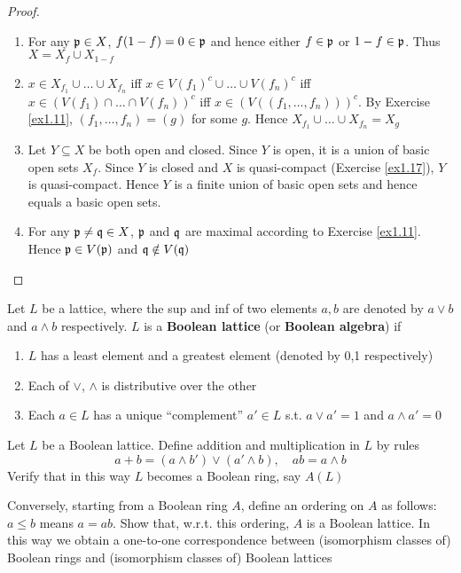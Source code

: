 \documentclass[11pt]{article}
\begin{document}
\begin{proof}
\begin{enumerate}
\item For any \(\mathfrak{p}\in X\), \(f(1-f)=0\in\mathfrak{p}\) and hence either \(f\in\mathfrak{p}\) or \(1-f\in\mathfrak{p}\). Thus \(X=X_f\cup X_{1-f}\)
\item \(x\in X_{f_1}\cup\dots\cup X_{f_n}\) iff \(x\in V(f_1)^c\cup\dots\cup V(f_n)^c\) iff \(x\in(V(f_1)\cap\dots\cap V(f_n))^c\) iff
\(x\in(V((f_1,\dots,f_n)))^c\). By Exercise \ref{ex1.11}, \((f_1,\dots,f_n)=(g)\) for some \(g\).
Hence \(X_{f_1}\cup\dots\cup X_{f_n}=X_g\)
\item Let \(Y\subseteq X\) be both open and closed. Since \(Y\) is open, it is a union of basic open
sets \(X_f\). Since \(Y\) is closed and \(X\) is quasi-compact (Exercise \ref{ex1.17}), \(Y\)
is quasi-compact. Hence \(Y\) is a finite union of basic open sets and hence equals a basic
open sets.
\item For any \(\mathfrak{p}\neq\mathfrak{q}\in X\), \(\mathfrak{p}\) and \(\mathfrak{q}\) are maximal according to Exercise \ref{ex1.11}.
Hence \(\mathfrak{p}\in V(\mathfrak{p})\) and \(\mathfrak{q}\notin V(\mathfrak{q})\)
\end{enumerate}
\end{proof}

\begin{exercise}
\label{ex1.24}
Let \(L\) be a lattice, where the sup and inf of two elements \(a,b\) are denoted by \(a\vee b\)
and \(a\wedge b\) respectively. \(L\) is a \textbf{Boolean lattice} (or \textbf{Boolean algebra}) if
\begin{enumerate}
\item \(L\) has a least element and a greatest element (denoted by 0,1 respectively)
\item Each of \(\vee\), \(\wedge\) is distributive over the other
\item Each \(a\in L\) has a unique ``complement'' \(a'\in L\) s.t. \(a\vee a'=1\) and \(a\wedge a'=0\)
\end{enumerate}


Let \(L\) be a Boolean lattice. Define addition and multiplication in \(L\) by rules
\begin{equation*}
a+b=(a\wedge b')\vee(a'\wedge b),\quad ab=a\wedge b
\end{equation*}
Verify that in this way \(L\) becomes a Boolean ring, say \(A(L)\)

Conversely, starting from a Boolean ring \(A\), define an ordering on \(A\) as follows: \(a\le b\)
means \(a=ab\). Show that, w.r.t. this ordering, \(A\) is a Boolean lattice. In this way we
obtain a one-to-one correspondence between (isomorphism classes of) Boolean rings
and (isomorphism classes of) Boolean lattices
\end{exercise}
\end{document}
